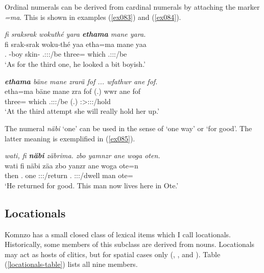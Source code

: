 Ordinal numerals can be derived from cardinal numerals by attaching the   marker \emph{=ma}. This is shown in examples (\ref{ex083}) and (\ref{ex084}).

\begin{exe}
	\ex \emph{fi sraksrak wokuthé yara \textbf{ethama} mane yara.}\\
	\gll fi srak-srak woku-thé yaa etha=ma mane yaa\\
	\Third.{\Abs} \Redup-boy skin-{\Adlzr} \Tsg.\Masc:\Sbj:\Pst:\Ipfv/be three={\Char} which \Tsg.\Masc:\Sbj:\Pst:\Ipfv/be\\
	\trans `As for the third one, he looked a bit boyish.' 
	\label{ex083}
\end{exe}
\begin{exe}
	\ex \emph{\textbf{ethama} bäne mane zrarä fof ... wfathwr ane fof.}\\
	\gll etha=ma bäne mane zra fof (.) wwr ane fof\\
	three={\Char} {\Recog} which \Tsg.\F:\Sbj:\Irr:\Ipfv/be {\Emph} (.) \Stsg:\Sbj>\Tsg{}\F{}:\Obj:\Nonpast:\Ipfv/hold {\Dem} {\Emph}\\
	\trans `At the third attempt she will really hold her up.' 
	\label{ex084}
\end{exe}

The numeral \emph{näbi} `one' can be used in the sense of `one way' or `for good'. The latter meaning is exemplified in (\ref{ex085}).

\begin{exe}
	\ex \emph{wati, fi \textbf{näbi} zäbrima. zbo yamnzr ane woga oten.}\\
	\gll wati fi näbi zäa zbo yanzr ane woga ote=n\\
	then \Third.{\Abs} one \Sg:\Sbj:\Pst:\Pfv/return {\Prox}.{\All} \Tsg\Masc:\Sbj:\Nonpast:\Ipfv/dwell {\Dem} man ote=\Loc\\
	\trans `He returned for good. This man now lives here in Ote.'
	\label{ex085}
\end{exe}

\subsection{Locationals} \label{locationals-sec}

Komnzo has a small closed class of lexical items which I call locationals. Historically, some members of this subclass are derived from nouns. Locationals may act as hosts of  clitics, but for spatial cases only (, , and ). Table (\ref{locationals-table}) lists all nine members.

